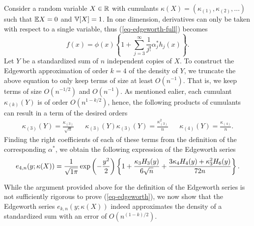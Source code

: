 \begin{example} \label{ex-edgeworth-1d}
    Consider a random variable $X \in \mathbb{R}$ with cumulants $\kappa(X) = (\kappa_{(1)}, \kappa_{(2)}, \ldots)$ such that $\mathbb{E}{X} = 0$ and $\mathbb{V}[X] = 1$. In one dimension, derivatives can only be taken with respect to a single variable, thus (\ref{eq-edgeworth-full}) becomes
    \begin{equation*}
        f(x) = \phi(x) \left\{
            1 + \sum_{j=3}^\infty  \frac{1}{j!}\alpha^*_j h_j(x)
        \right\}.
    \end{equation*}
    Let $Y$ be a standardized sum of $n$ independent copies of $X$. To construct the Edgeworth approximation of order $k = 4$ of the density of $Y$, we truncate the above equation to only keep terms of size at least $O(n^{-1})$. That is, we keep terms of size $O(n^{-1/2})$ and $O(n^{-1})$. As mentioned ealier, each cumulant $\kappa_{(k)}(Y)$ is of order $O(n^{1-k/2})$, hence, the following products of cumulants can result in a term of the desired orders
    \begin{align*}
        \kappa_{(3)}(Y) = \frac{\kappa_{(3)}}{\sqrt{n}} && \kappa_{(3)}(Y)\kappa_{(3)}(Y) = \frac{\kappa_{(3)}^2}{n} && \kappa_{(4)}(Y) = \frac{\kappa_{(4)}}{n}.
    \end{align*}
    Finding the right coefficients of each of these terms from the definition of the corresponding $\alpha^*$, we obtain the following expression of the Edgeworth series
    \begin{equation} \label{eq-edgeworth-1d-4}
        e_{4, n}(y; \kappa(X)) = \frac{1}{\sqrt{1\pi}}\exp\left(-\frac{y^2}{2}\right)\left\{1 + \frac{\kappa_3 H_3(y)}{6\sqrt{n}} + \frac{3\kappa_4 H_4(y) + \kappa_3^2 H_6(y)}{72 n}\right\}.
    \end{equation}
\end{example}

While the argument provided above for the definition of the Edgeworth series is not sufficiently rigorous to prove (\ref{eq-edgeworth}), we now show that the Edgeworth series $e_{k, n}(y; \kappa(X))$ indeed approximates the density of a standardized sum with an error of $O(n^{(1-k)/2})$.

